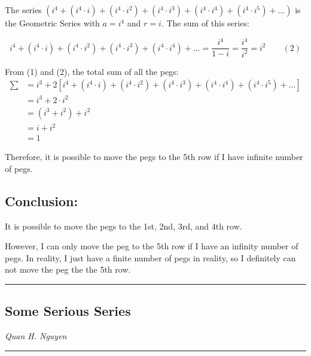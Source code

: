 \documentclass[12pt]{article}
\begin{document}
\noindent The series $\displaystyle \left(i^4+ \left(i^4\cdot i\right)+ \left(i^4\cdot i^2\right)+ \left(i^4\cdot i^3\right)+ \left(i^4\cdot i^4\right)+ \left(i^4\cdot i^5\right)+ \dots\right) $ is the Geometric Series with $a=i^4$ and $r=i$. The sum of this series:
    
$$ i^4+ \left(i^4\cdot i\right)+ \left(i^4\cdot i^2\right)+ \left(i^4\cdot i^3\right)+ \left(i^4\cdot i^4\right)+ \dots =\frac{i^4}{1-i} =\frac{i^4}{i^2} =i^2 \qquad (2)$$
    
\noindent From (1) and (2), the total sum of all the pegs:
\begin{align*}
    \sum &= i^3+ 2\left[i^4+ \left(i^4\cdot i\right)+ \left(i^4\cdot i^2\right)+ \left(i^4\cdot i^3\right)+ \left(i^4\cdot i^4\right)+ \left(i^4\cdot i^5\right)+ \dots \right] \\
    &= i^3+ 2\cdot i^2\\
    &= \left(i^3+ i^2\right) + i^2\\
    &= i+ i^2\\
    &= 1
\end{align*}
    
\noindent Therefore, it is possible to move the pegs to the 5th row if I have infinite number of pegs.
    
\vspace{1cm}

\subsection*{Conclusion:}

\noindent It is possible to move the pegs to the 1st, 2nd, 3rd, and 4th row.

\noindent However, I can only move the peg to the 5th row if I have an infinity number of pegs. In reality, I just have a finite number of pegs in reality, so I definitely can not move the peg the the 5th row.
    

    
    
\newpage

\hrule
\vspace{.2mm}
\begin{center}
    \section*{Some Serious Series}
    \textit{Quan H. Nguyen}
\end{center}
\vspace{.2mm}
\hrule
\end{document}
